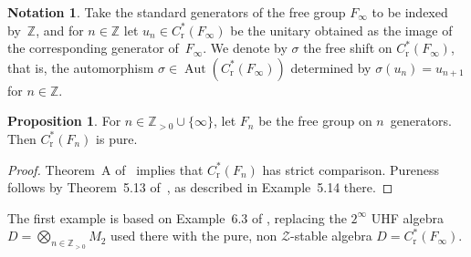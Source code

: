 \documentclass[10pt]{amsart}
\numberwithin{equation}{section}
\theoremstyle{definition}
\newtheorem{prp}[thm]{Proposition}
\newtheorem{ntn}[thm]{Notation}
\newcommand{\sm}{\sigma}
\newcommand{\Z}{{\mathbb{Z}}}
\newcommand{\N}{{\mathbb{Z}}_{> 0}}
\newcommand{\Aut}{{\operatorname{Aut}}}
\newcommand{\I}{\infty}
\newcommand{\JS}{\mathcal{Z}}
\begin{document}
\begin{ntn}\label{N_2_FreeShift}
Take the standard generators of the free group $F_{\infty}$
to be indexed by~$\Z$, and for $n \in \Z$ let
$u_n \in C^*_{\mathrm{r}} (F_{\infty})$ be the unitary
obtained as the image of the corresponding generator
of~$F_{\infty}$.
We denote by $\sm$ the free shift on
$C^*_{\mathrm{r}} (F_{\infty})$, that is, the automorphism
$\sm \in \Aut ( C^*_{\mathrm{r}} (F_{\infty}) )$ determined
by $\sm (u_n) = u_{n + 1}$ for $n \in \Z$.
\end{ntn}

\begin{prp}\label{P_FreePure}
For $n \in \N \cup \{ \I \}$, let $F_n$ be the free
group on $n$~generators. Then $C^*_{\mathrm{r}} (F_n)$ is pure.
\end{prp}

\begin{proof}
%
Theorem~A of~\cite{AGKEP} implies that
$C^*_{\mathrm{r}} (F_n)$ has strict comparison.
Pureness follows by Theorem~5.13 of~\cite{AnPrTlVt}, as
described in Example~5.14 there.
%
\end{proof}

The first example is based on Example~6.3 of \cite{ArBcPh2},
replacing the $2^{\infty}$ UHF algebra
$D = \bigotimes_{n \in \N} M_{2}$ used there with the pure,
non $\JS$-stable algebra $D = C^*_{\mathrm{r}} (F_{\infty})$.
\end{document}
